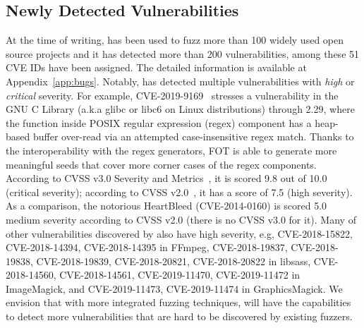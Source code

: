 \subsection{Newly Detected Vulnerabilities}

At the time of writing, {\FOT} has been used to fuzz more than 100 widely used open source projects and it has detected more than 200 vulnerabilities, among these 51 CVE IDs have been assigned. The detailed information is available at Appendix~\ref{app:bugs}. Notably, \FOT has detected multiple vulnerabilities with \emph{high} or \emph{critical} severity. For example, CVE-2019-9169~\cite{CVE-2019-9169} stresses a vulnerability in the GNU C Library (a.k.a glibc or libc6 on Linux distributions) through 2.29, where the function  inside POSIX regular expression (regex) component has a heap-based buffer over-read via an attempted case-insensitive regex match. Thanks to the interoperability with the regex generators, FOT is able to generate more meaningful seeds that cover more corner cases of the regex components. According to CVSS v3.0 Severity and Metrics~\cite{cvss3}, it is scored 9.8 out of 10.0 (critical severity); according to CVSS v2.0~\cite{cvss2}, it has a score of 7.5 (high severity). As a comparison, the notorious HeartBleed (CVE-2014-0160) is scored 5.0 medium severity according to CVSS v2.0 (there is no CVSS v3.0 for it). Many of other vulnerabilities discovered by \FOT also have high severity, e.g, CVE-2018-15822, CVE-2018-14394, CVE-2018-14395 in FFmpeg, CVE-2018-19837, CVE-2018-19838, CVE-2018-19839, CVE-2018-20821, CVE-2018-20822 in libsass, CVE-2018-14560, CVE-2018-14561, CVE-2019-11470, CVE-2019-11472 in ImageMagick, and CVE-2019-11473, CVE-2019-11474 in GraphicsMagick. We envision that with more integrated fuzzing techniques, \FOT will have the capabilities to detect more vulnerabilities that are hard to be discovered by existing fuzzers.
